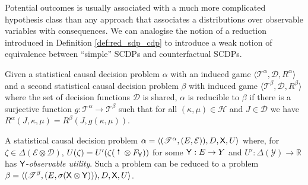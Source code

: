 Potential outcomes is usually associated with a much more complicated hypothesis class than any approach that associates a distributions over observable variables with consequences. We can analogise the notion of a reduction introduced in Definition \ref{def:red_sdp_cdp} to introduce a weak notion of equivalence between ``simple'' SCDPs and counterfactual SCDPs.

\begin{definition}[Reduction]\label{def:red_scdp}
Given a statistical causal decision problem $\alpha$ with an induced game $\langle \mathscr{T}^\alpha, \mathscr{D}, R^\alpha \rangle$ and a second statistical causal decision problem $\beta$ with induced game $\langle \mathscr{T}^\beta, \mathscr{D}, R^\beta\rangle$ where the set of decision functions $\mathscr{D}$ is shared, $\alpha$ is reducible to $\beta$ if there is a surjective function $g:\mathscr{T}^\alpha\to \mathscr{T}^\beta$ such that for all $(\kappa,\mu)\in \mathscr{H}$ and $J\in \mathscr{D}$ we have $R^\alpha(J,\kappa,\mu)=R^\beta(J,g(\kappa,\mu))$.
\end{definition}

\begin{theorem}\label{th:scdp_obu_red}
A statistical causal decision problem $\alpha=\langle (\mathscr{T}^\alpha,(E,\mathcal{E})),D,\mathsf{X},U\rangle$ where, for $\zeta\in \Delta(\mathcal{E}\otimes\mathcal{D})$, $U(\zeta)=U'(\zeta (\stopper{0.15} \otimes F_{\RV{Y}}))$ for some $\mathsf{Y}:E\to Y$ and $U':\Delta(\mathcal{Y})\to \mathbb{R}$ has $\mathsf{Y}$-\emph{observable utility}. Such a problem can be reduced to a problem $\beta=\langle (\mathscr{T}^\beta,(E,\sigma(\mathsf{X}\otimes\mathsf{Y}))),D,\mathsf{X},U\rangle$.
\end{theorem}

